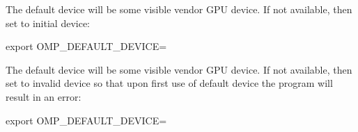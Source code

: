 The default device will be some visible vendor  GPU device. 
If not available, then set to initial device:
\begin{boxedcode}
export OMP_DEFAULT_DEVICE=
\end{boxedcode}

The default device will be some visible vendor  GPU device. 
If not available, then set to invalid device so that upon first use of default 
device the program will result in an error:
\begin{boxedcode}
export OMP_DEFAULT_DEVICE=
\end{boxedcode}

